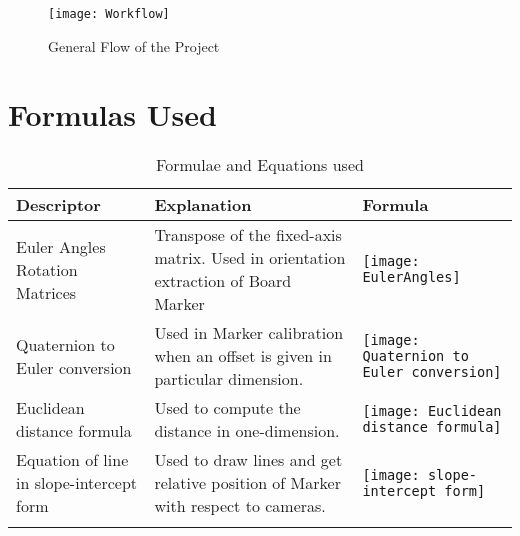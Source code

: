 \begin{figure}[h]
  \centering
  \texttt{[image: Workflow]}
  \caption{General Flow of the Project}
\end{figure}
\bigskip

\section{Formulas Used}
\begin{longtable}{|>{\raggedright\arraybackslash}p{3cm}|p{4cm}|p{7cm}|}
\hline
\textbf{Descriptor} & \textbf{Explanation} & \textbf{Formula}\\
\hline
\vspace{0pt}\large Euler Angles Rotation Matrices &
Transpose of the fixed-axis matrix. Used in orientation extraction of Board Marker & 
\begin{minipage}{.3\textwidth}
      \texttt{[image: EulerAngles]}
\end{minipage}
\\
\hline

\vspace{0pt}\large Quaternion to Euler conversion &
Used in Marker calibration when an offset is given in particular dimension. & 
\begin{minipage}{.3\textwidth}
      \texttt{[image: Quaternion to Euler conversion]}
\end{minipage}
\\
\hline



\vspace{0pt}\large Euclidean distance formula &
Used to compute the distance in one-dimension. & 
\begin{minipage}{.3\textwidth}
      \texttt{[image: Euclidean distance formula]}
\end{minipage}
\\
\hline


\vspace{0pt}\large Equation of line in slope-intercept form &
Used to draw lines and get relative position of Marker with respect to cameras. & 
\bigskip

\begin{minipage}{.3\textwidth}
      \texttt{[image: slope-intercept form]}
\end{minipage}
\\
\hline



\caption{Formulae and Equations used}
\end{longtable}

